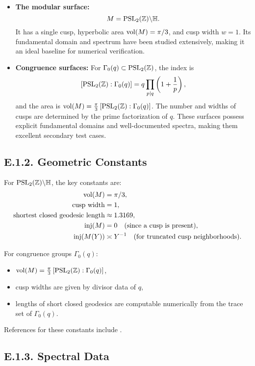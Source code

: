 \begin{itemize}
  \item \textbf{The modular surface:} 
  \[
    M = \operatorname{PSL}_2(\mathbb Z)\backslash \mathbb H.
  \]
  It has a single cusp, hyperbolic area $\operatorname{vol}(M) = \pi/3$, and cusp width $w=1$. 
  Its fundamental domain and spectrum have been studied extensively, making it an ideal 
  baseline for numerical verification.

  \item \textbf{Congruence surfaces:} 
  For $\Gamma_0(q)\subset \operatorname{PSL}_2(\mathbb Z)$, the index is
  \[
    [\operatorname{PSL}_2(\mathbb Z):\Gamma_0(q)] = q \prod_{p\mid q}\left(1+\frac{1}{p}\right),
  \]
  and the area is $\operatorname{vol}(M) = \tfrac{\pi}{3}\,[\operatorname{PSL}_2(\mathbb Z):\Gamma_0(q)]$.
  The number and widths of cusps are determined by the prime factorization of $q$.
  These surfaces possess explicit fundamental domains and well-documented spectra, 
  making them excellent secondary test cases.
\end{itemize}

\medskip
\subsection*{E.1.2. Geometric Constants}

For $\operatorname{PSL}_2(\mathbb Z)\backslash \mathbb H$, the key constants are:
\begin{align*}
  \operatorname{vol}(M) &= \pi/3, \\
  \text{cusp width} &= 1, \\
  \text{shortest closed geodesic length} &\approx 1.3169, \\
  \operatorname{inj}(M) &= 0 \quad (\text{since a cusp is present}), \\
  \operatorname{inj}(M(Y)) &\asymp Y^{-1} \quad (\text{for truncated cusp neighborhoods}).
\end{align*}

For congruence groups $\Gamma_0(q)$:
\begin{itemize}
  \item $\operatorname{vol}(M) = \tfrac{\pi}{3}\,[\operatorname{PSL}_2(\mathbb Z):\Gamma_0(q)]$,
  \item cusp widths are given by divisor data of $q$, 
  \item lengths of short closed geodesics are computable numerically from the trace set of $\Gamma_0(q)$.
\end{itemize}
References for these constants include \cite{Iwaniec2002, Buser1992}.

\medskip
\subsection*{E.1.3. Spectral Data}

